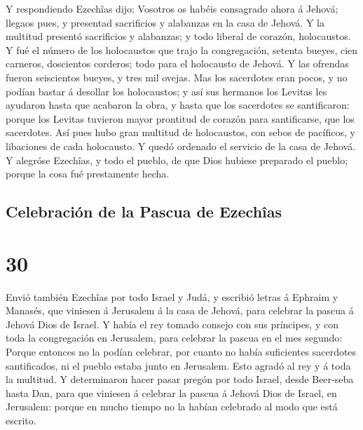  Y respondiendo Ezechîas dijo: Vosotros os habéis
consagrado ahora á Jehová; llegaos pues, y presentad sacrificios y
alabanzas en la casa de Jehová. Y la multitud presentó sacrificios y
alabanzas; y todo liberal de corazón, holocaustos.  Y fué
el número de los holocaustos que trajo la congregación, setenta bueyes,
cien carneros, doscientos corderos; todo para el holocausto de Jehová.
 Y las ofrendas fueron seiscientos bueyes, y tres mil
ovejas.  Mas los sacerdotes eran pocos, y no podían bastar
á desollar los holocaustos; y así sus hermanos los Levitas les ayudaron
hasta que acabaron la obra, y hasta que los sacerdotes se santificaron:
porque los Levitas tuvieron mayor prontitud de corazón para
santificarse, que los sacerdotes.  Así pues hubo gran
multitud de holocaustos, con sebos de pacíficos, y libaciones de cada
holocausto. Y quedó ordenado el servicio de la casa de Jehová.
 Y alegróse Ezechîas, y todo el pueblo, de que Dios hubiese
preparado el pueblo; porque la cosa fué prestamente hecha.

\hypertarget{celebraciuxf3n-de-la-pascua-de-ezechuxeeas}{%
\subsection{Celebración de la Pascua de
Ezechîas}\label{celebraciuxf3n-de-la-pascua-de-ezechuxeeas}}

\hypertarget{section-29}{%
\section{30}\label{section-29}}

 Envió también Ezechîas por todo Israel y Judá, y escribió
letras á Ephraim y Manasés, que viniesen á Jerusalem á la casa de
Jehová, para celebrar la pascua á Jehová Dios de Israel.  Y
había el rey tomado consejo con sus príncipes, y con toda la
congregación en Jerusalem, para celebrar la pascua en el mes segundo:
 Porque entonces no la podían celebrar, por cuanto no había
suficientes sacerdotes santificados, ni el pueblo estaba junto en
Jerusalem.  Esto agradó al rey y á toda la multitud.
 Y determinaron hacer pasar pregón por todo Israel, desde
Beer-seba hasta Dan, para que viniesen á celebrar la pascua á Jehová
Dios de Israel, en Jerusalem: porque en mucho tiempo no la habían
celebrado al modo que está escrito.

